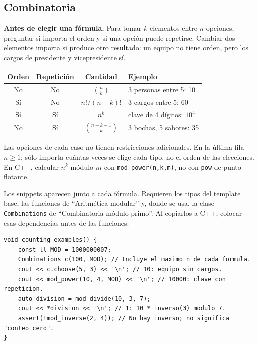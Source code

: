 \subsection{Combinatoria}
\textbf{Antes de elegir una f\'ormula.} Para tomar $k$ elementos entre $n$
opciones, preguntar si importa el orden y si una opci\'on puede repetirse.
Cambiar dos elementos importa si produce otro resultado: un equipo no tiene
orden, pero los cargos de presidente y vicepresidente s\'i.

\begin{center}
\begin{tabular}{cccl}
Orden & Repetici\'on & Cantidad & Ejemplo \\
\hline
No & No & $\binom nk$ & 3 personas entre 5: 10 \\
S\'i & No & $n!/(n-k)!$ & 3 cargos entre 5: 60 \\
S\'i & S\'i & $n^k$ & clave de 4 d\'igitos: $10^4$ \\
No & S\'i & $\binom{n+k-1}{k}$ & 3 bochas, 5 sabores: 35 \\
\end{tabular}
\end{center}

Las opciones de cada caso no tienen restricciones adicionales. En la \'ultima
fila $n\ge1$: s\'olo importa cu\'antas veces se elige cada tipo, no el orden de
las elecciones. En C++, calcular $n^k$ m\'odulo $m$ con
\texttt{mod\_power(n,k,m)}, no con \texttt{pow} de punto flotante.

Los snippets aparecen junto a cada f\'ormula. Requieren los tipos del template
base, las funciones de ``Aritm\'etica modular'' y, donde se usa, la clase
\texttt{Combinations} de ``Combinatoria m\'odulo primo''. Al copiarlos a C++,
colocar esas dependencias antes de las funciones.

\begin{lstlisting}[style=cpp]
void counting_examples() {
    const ll MOD = 1000000007;
    Combinations c(100, MOD); // Incluye el maximo n de cada formula.
    cout << c.choose(5, 3) << '\n'; // 10: equipo sin cargos.
    cout << mod_power(10, 4, MOD) << '\n'; // 10000: clave con repeticion.
    auto division = mod_divide(10, 3, 7);
    cout << *division << '\n'; // 1: 10 * inverso(3) modulo 7.
    assert(!mod_inverse(2, 4)); // No hay inverso; no significa "conteo cero".
}
\end{lstlisting}

